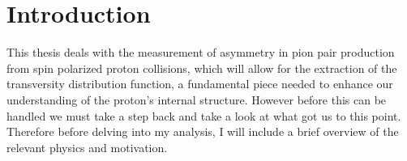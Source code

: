 \documentclass[abstract = on,listof=totoc, bibliography=totoc]{scrreprt}
\begin{document}



\chapter{Introduction}

This thesis deals with the measurement of asymmetry in pion pair production from spin polarized proton collisions, which will allow for the extraction of the transversity distribution function, a fundamental piece needed to enhance our understanding of the proton's internal structure. However before this can be handled we must take a step back and take a look at what got us to this point. Therefore before delving into my analysis, I will include a brief overview of the relevant physics and motivation. 
\end{document}
